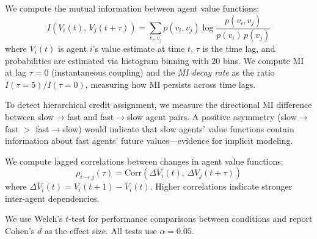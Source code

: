  We compute the mutual information between agent value functions:
\begin{equation}
    I(V_i(t),\, V_j(t + \tau)) = \sum_{v_i, v_j} p(v_i, v_j) \log \frac{p(v_i, v_j)}{p(v_i)\, p(v_j)}
\label{eq:mi}
\end{equation}
where $V_i(t)$ is agent $i$'s value estimate at time $t$, $\tau$ is the time lag, and probabilities are estimated via histogram binning with 20 bins. We compute MI at lag $\tau = 0$ (instantaneous coupling) and the \emph{MI decay rate} as the ratio $I(\tau{=}5) / I(\tau{=}0)$, measuring how MI persists across time lags.

 To detect hierarchical credit assignment, we measure the directional MI difference between slow$\to$fast and fast$\to$slow agent pairs. A positive asymmetry (slow$\to$fast $>$ fast$\to$slow) would indicate that slow agents' value functions contain information about fast agents' future values---evidence for implicit modeling.

 We compute lagged correlations between changes in agent value functions:
\begin{equation}
    \rho_{i \to j}(\tau) = \text{Corr}\!\left(\Delta V_i(t),\, \Delta V_j(t + \tau)\right)
\label{eq:influence}
\end{equation}
where $\Delta V_i(t) = V_i(t+1) - V_i(t)$. Higher correlations indicate stronger inter-agent dependencies.

 We use Welch's $t$-test for performance comparisons between conditions and report Cohen's $d$ as the effect size. All tests use $\alpha = 0.05$.
